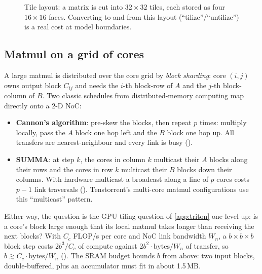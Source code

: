 \begin{figure}[t]
\centering
{}
\caption{Tile layout: a matrix is cut into $32\times32$ tiles, each stored as four $16\times16$
faces. Converting to and from this layout (``tilize''/``untilize'') is a real cost at model
boundaries.}
\label{fig:accel:tile}
\end{figure}

\subsection{Matmul on a grid of cores}

A large matmul is distributed over the core grid by \emph{block sharding}: core $(i,j)$ owns
output block $C_{ij}$ and needs the $i$-th block-row of $A$ and the $j$-th block-column of $B$. Two
classic schedules from distributed-memory computing map directly onto a 2-D NoC:
\begin{itemize}
  \item \textbf{Cannon's algorithm}: pre-skew the blocks, then repeat $p$ times: multiply locally,
    pass the $A$ block one hop left and the $B$ block one hop up. All transfers are nearest-neighbour
    and every link is busy ().
  \item \textbf{SUMMA}: at step $k$, the cores in column $k$ multicast their $A$ blocks along their rows
    and the cores in row $k$ multicast their $B$ blocks down their columns. With hardware multicast a
    broadcast along a line of $p$ cores costs $p-1$ link traversals ().
    Tenstorrent's multi-core matmul configurations use this ``multicast'' pattern.
\end{itemize}
Either way, the question is the GPU tiling question of \cref{app:triton} one level up: is
a core's block large enough that its local matmul takes longer than receiving the next blocks? With
$C_c$ FLOP/s per core and NoC link bandwidth $W_n$, a $b\times b\times b$ block step costs $2b^3/C_c$ of
compute against $2b^2\cdot\text{bytes}/W_n$ of transfer, so $b\gtrsim C_c\cdot\text{bytes}/W_n$
(). The SRAM budget bounds $b$ from above: two input blocks,
double-buffered, plus an accumulator must fit in about 1.5\,MB.

